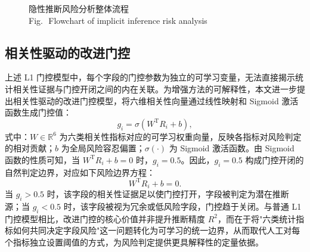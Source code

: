 \documentclass[UTF8,zihao=5,twoside]{ctexart}
\numberwithin{equation}{section}
\newcommand{\figbicaption}[2]{%
  \caption{#1\\[-0.2em]\small Fig.\,\thefigure\ #2}
}
\begin{document}
\begin{figure}[!tbp]
\centering
{}
\figbicaption{隐性推断风险分析整体流程}{Flowchart of implicit inference risk analysis}
\label{fig:method_flow}
\end{figure}

\subsection{相关性驱动的改进门控}
上述 L1 门控模型中，每个字段的门控参数为独立的可学习变量，无法直接揭示统计相关性证据与门控开闭之间的内在关联。为增强方法的可解释性，本文进一步提出相关性驱动的改进门控模型，将六维相关性向量通过线性映射和 Sigmoid 激活函数生成门控值：
\begin{equation}
g_i=\sigma(W^{\mathrm{T}}R_i+b),
\end{equation}
式中：$W\in\mathbb{R}^{6}$ 为六类相关性指标对应的可学习权重向量，反映各指标对风险判定的相对贡献；$b$ 为全局风险容忍偏置；$\sigma(\cdot)$ 为 Sigmoid 激活函数。由 Sigmoid 函数的性质可知，当 $W^{\mathrm{T}}R_i+b=0$ 时，$g_i=0.5$。因此，$g_i=0.5$ 构成门控开闭的自然判定边界，对应如下风险边界方程：
\begin{equation}
W^{\mathrm{T}}R_i+b=0.
\end{equation}
当 $g_i>0.5$ 时，该字段的相关性证据足以使门控打开，字段被判定为潜在推断源；当 $g_i<0.5$ 时，该字段被视为冗余或低风险字段，门控趋于关闭。与普通 L1 门控模型相比，改进门控的核心价值并非提升推断精度 $R^2$，而在于将"六类统计指标如何共同决定字段风险"这一问题转化为可学习的统一边界，从而取代人工对每个指标独立设置阈值的方式，为风险判定提供更具解释性的定量依据。
\end{document}
